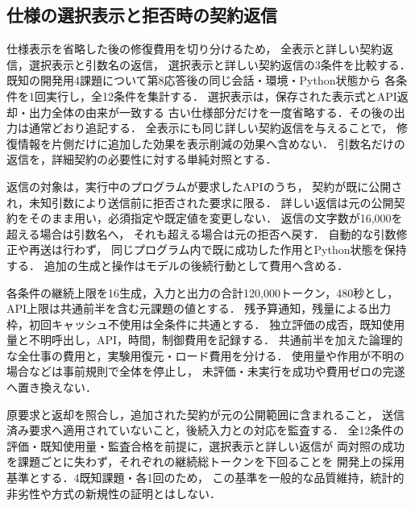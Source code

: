 \subsection{仕様の選択表示と拒否時の契約返信}
仕様表示を省略した後の修復費用を切り分けるため，
全表示と詳しい契約返信，選択表示と引数名の返信，
選択表示と詳しい契約返信の3条件を比較する．
既知の開発用4課題について第8応答後の同じ会話・環境・Python状態から
各条件を1回実行し，全12条件を集計する．
選択表示は，保存された表示式とAPI返却・出力全体の由来が一致する
古い仕様部分だけを一度省略する．その後の出力は通常どおり追記する．
全表示にも同じ詳しい契約返信を与えることで，
修復情報を片側だけに追加した効果を表示削減の効果へ含めない．
引数名だけの返信を，詳細契約の必要性に対する単純対照とする．

返信の対象は，実行中のプログラムが要求したAPIのうち，
契約が既に公開され，未知引数により送信前に拒否された要求に限る．
詳しい返信は元の公開契約をそのまま用い，必須指定や既定値を変更しない．
返信の文字数が16,000を超える場合は引数名へ，
それも超える場合は元の拒否へ戻す．
自動的な引数修正や再送は行わず，
同じプログラム内で既に成功した作用とPython状態を保持する．
追加の生成と操作はモデルの後続行動として費用へ含める．

各条件の継続上限を16生成，入力と出力の合計120,000トークン，480秒とし，
API上限は共通前半を含む元課題の値とする．
残予算通知，残量による出力枠，初回キャッシュ不使用は全条件に共通とする．
独立評価の成否，既知使用量と不明呼出し，API，時間，制御費用を記録する．
共通前半を加えた論理的な全仕事の費用と，実験用復元・ロード費用を分ける．
使用量や作用が不明の場合などは事前規則で全体を停止し，
未評価・未実行を成功や費用ゼロの完遂へ置き換えない．

原要求と返却を照合し，追加された契約が元の公開範囲に含まれること，
送信済み要求へ適用されていないこと，後続入力との対応を監査する．
全12条件の評価・既知使用量・監査合格を前提に，選択表示と詳しい返信が
両対照の成功を課題ごとに失わず，それぞれの継続総トークンを下回ることを
開発上の採用基準とする．4既知課題・各1回のため，
この基準を一般的な品質維持，統計的非劣性や方式の新規性の証明とはしない．

